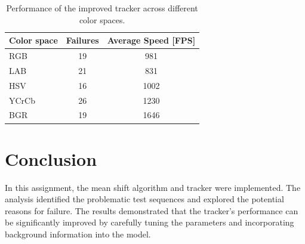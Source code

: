 \documentclass[9pt]{IEEEtran}
\begin{document}
   \begin{table}[h]
    \centering
    \caption{Performance of the improved tracker across different color spaces.}
    \begin{tabular}{lcc}
    \hline
    \textbf{Color space} & \textbf{Failures} & \textbf{Average Speed [FPS]} \\ 
    \hline
    RGB                 & 19                & 981                  \\ 
    LAB                 & 21                & 831                  \\ 
    HSV                 & 16                & 1002                 \\ 
    YCrCb               & 26                & 1230                 \\ 
    BGR                 & 19                & 1646                 \\ 
    \hline
    \end{tabular}

    \label{tab:color_spaces_results}
    \end{table}
    

\section{Conclusion}
In this assignment, the mean shift algorithm and tracker were implemented.
 The analysis identified the problematic test sequences and explored the potential reasons for failure.
  The results demonstrated that the tracker’s performance can be significantly improved by carefully tuning the 
  parameters and incorporating background information into the model.


\end{document}
